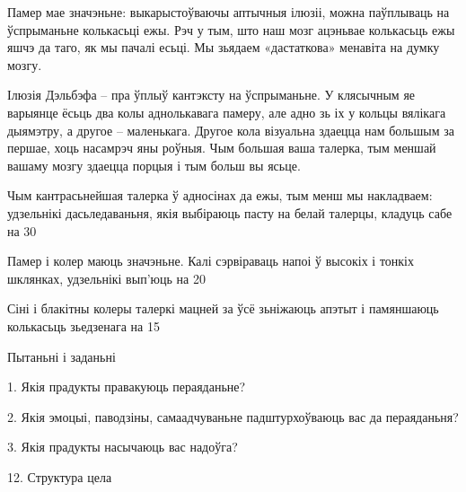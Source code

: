 Памер мае значэньне: выкарыстоўваючы аптычныя ілюзіі, можна паўплываць на ўспрыманьне колькасьці ежы. Рэч у тым, што наш мозг ацэньвае колькасьць ежы яшчэ да таго, як мы пачалі есьці. Мы зьядаем «дастаткова» менавіта на думку мозгу.

Ілюзія Дэльбэфа – пра ўплыў кантэксту на ўспрыманьне. У клясычным яе варыянце ёсьць два колы аднолькавага памеру, але адно зь іх у кольцы вялікага дыямэтру, а другое – маленькага. Другое кола візуальна здаецца нам большым за першае, хоць насамрэч яны роўныя. Чым большая ваша талерка, тым меншай вашаму мозгу здаецца порцыя і тым больш вы ясьце.

Чым кантрасьнейшая талерка ў адносінах да ежы, тым менш мы накладваем: удзельнікі дасьледаваньня, якія выбіраюць пасту на белай талерцы, кладуць сабе на 30%

Памер і колер маюць значэньне. Калі сэрвіраваць напоі ў высокіх і тонкіх шклянках, удзельнікі вып'юць на 20%

Сіні і блакітны колеры талеркі мацней за ўсё зьніжаюць апэтыт і памяншаюць колькасьць зьедзенага на 15%

Пытаньні і заданьні

1. Якія прадукты правакуюць пераяданьне?

2. Якія эмоцыі, паводзіны, самаадчуваньне падштурхоўваюць вас да пераяданьня?

3. Якія прадукты насычаюць вас надоўга?


12. Структура цела

